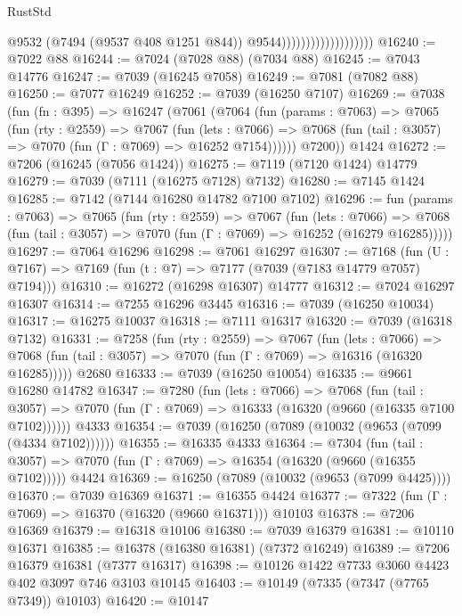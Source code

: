 \begin{lexlean}{RustStd}
\begin{coremodule}
                                          @9532
                                          (@7494 (@9537 @408 @1251 @844))
                                          @9544)))))))))))))))))))
@16240 := @7022 @88
@16244 := @7024 (@7028 @88) (@7034 @88)
@16245 := @7043 @14776
@16247 := @7039 (@16245 @7058)
@16249 := @7081 (@7082 @88)
@16250 := @7077 @16249
@16252 := @7039 (@16250 @7107)
@16269 := @7038
    (fun (fn : @395) =>
    @16247
      (@7061
        (@7064
          (fun (params : @7063) =>
          @7065
            (fun (rty : @2559) =>
            @7067
              (fun (lets : @7066) =>
              @7068 (fun (tail : @3057) => @7070 (fun (Γ : @7069) => @16252 @7154))))))
        @7200))
    @1424
@16272 := @7206 (@16245 (@7056 @1424))
@16275 := @7119 (@7120 @1424) @14779
@16279 := @7039 (@7111 (@16275 @7128) @7132)
@16280 := @7145 @1424
@16285 := @7142 (@7144 @16280 @14782 @7100 @7102)
@16296 := fun (params : @7063) =>
  @7065
    (fun (rty : @2559) =>
    @7067
      (fun (lets : @7066) =>
      @7068 (fun (tail : @3057) => @7070 (fun (Γ : @7069) => @16252 (@16279 @16285)))))
@16297 := @7064 @16296
@16298 := @7061 @16297
@16307 := @7168
    (fun (U : @7167) => @7169 (fun (t : @7) => @7177 (@7039 (@7183 @14779 @7057) @7194)))
@16310 := @16272 (@16298 @16307) @14777
@16312 := @7024 @16297 @16307
@16314 := @7255 @16296 @3445
@16316 := @7039 (@16250 @10034)
@16317 := @16275 @10037
@16318 := @7111 @16317
@16320 := @7039 (@16318 @7132)
@16331 := @7258
    (fun (rty : @2559) =>
    @7067
      (fun (lets : @7066) =>
      @7068 (fun (tail : @3057) => @7070 (fun (Γ : @7069) => @16316 (@16320 @16285)))))
    @2680
@16333 := @7039 (@16250 @10054)
@16335 := @9661 @16280 @14782
@16347 := @7280
    (fun (lets : @7066) =>
    @7068
      (fun (tail : @3057) =>
      @7070 (fun (Γ : @7069) => @16333 (@16320 (@9660 (@16335 @7100 @7102))))))
    @4333
@16354 := @7039 (@16250 (@7089 (@10032 (@9653 (@7099 (@4334 @7102))))))
@16355 := @16335 @4333
@16364 := @7304
    (fun (tail : @3057) => @7070 (fun (Γ : @7069) => @16354 (@16320 (@9660 (@16355 @7102)))))
    @4424
@16369 := @16250 (@7089 (@10032 (@9653 (@7099 @4425))))
@16370 := @7039 @16369
@16371 := @16355 @4424
@16377 := @7322 (fun (Γ : @7069) => @16370 (@16320 (@9660 @16371))) @10103
@16378 := @7206 @16369
@16379 := @16318 @10106
@16380 := @7039 @16379
@16381 := @10110 @16371
@16385 := @16378 (@16380 @16381) (@7372 @16249)
@16389 := @7206 @16379 @16381 (@7377 @16317)
@16398 := @10126 @1422 @7733 @3060 @4423 @402 @3097 @746 @3103 @10145
@16403 := @10149 (@7335 (@7347 (@7765 @7349)) @10103)
@16420 := @10147

\end{coremodule}
\end{lexlean}
